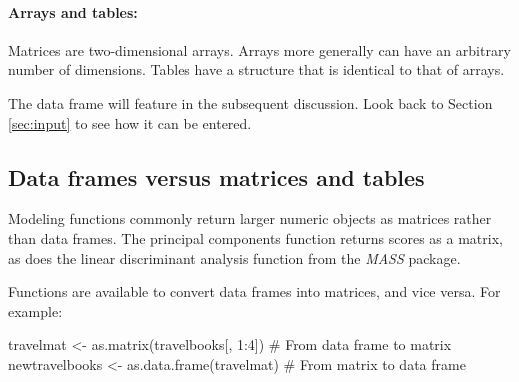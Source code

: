 \paragraph{Arrays and tables:} Matrices are two-dimensional arrays.
Arrays more generally can have an arbitrary number of dimensions.
Tables have a structure that is identical to that of arrays.

The data frame  will feature in the subsequent
discussion.  Look back to Section \ref{sec:input} to see how it can be
entered.



\subsection{Data frames versus matrices and tables}\label{ss:df-mat}

  Modeling functions commonly return
larger numeric objects as matrices rather than data frames. The
principal components function  returns scores as a
matrix, as does the linear discriminant analysis function
 from the {\em MASS} package.

Functions are available to convert data frames into matrices, and vice
versa. For example:
\begin{Schunk}
\begin{Sinput}
travelmat <- as.matrix(travelbooks[, 1:4])
  # From data frame to matrix
newtravelbooks <- as.data.frame(travelmat)
  # From matrix to data frame
\end{Sinput}
\end{Schunk}

\enlargethispage{24pt}

